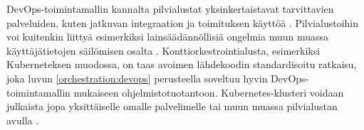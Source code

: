 DevOps-toimintamallin kannalta pilvialustat yksinkertaistavat tarvittavien palveluiden, kuten jatkuvan integraation ja toimituksen käyttöä \cite{Singh19}.
Pilvialustoihin voi kuitenkin liittyä esimerkiksi lainsäädännöllisiä ongelmia muun muassa käyttäjätietojen säilömisen osalta \cite{Barati22}.
Konttiorkestrointialusta, esimerkiksi Kuberneteksen muodossa, on taas avoimen lähdekoodin standardisoitu ratkaisu, joka luvun \ref{orchestration:devops} perusteella soveltuu hyvin DevOps-toimintamallin mukaiseen ohjelmistotuotantoon.
Kubernetes-klusteri voidaan julkaista jopa yksittäiselle omalle palvelimelle tai muun muassa pilvialustan avulla \cite{Muddinagiri19, Khan22}.
